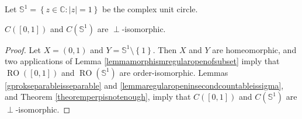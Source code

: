 Let $\mathbb{S}^1=\left\{z\in\mathbb{C}:|z|=1\right\}$ be the complex unit circle.

\begin{corollary}\label{corollary01circleperp}
	$C([0,1])$ and $C(\mathbb{S}^1)$ are $\perp$-isomorphic.
\end{corollary}
\begin{proof}
	Let $X=(0,1)$ and $Y=\mathbb{S}^1\setminus\left\{1\right\}$. Then $X$ and $Y$ are homeomorphic, and two applications of Lemma \ref{lemmamorphismregularopenofsubset} imply that $\operatorname{RO}([0,1])$ and $\operatorname{RO}(\mathbb{S}^1)$ are order-isomorphic. Lemmas \ref{gprokseparableisseparable} and \ref{lemmaregularopeninsecondcountableissigma}, and Theorem \ref{theoremperpisnotenough}, imply that $C([0,1])$ and $C(\mathbb{S}^1)$ are $\perp$-isomorphic.
\end{proof}
